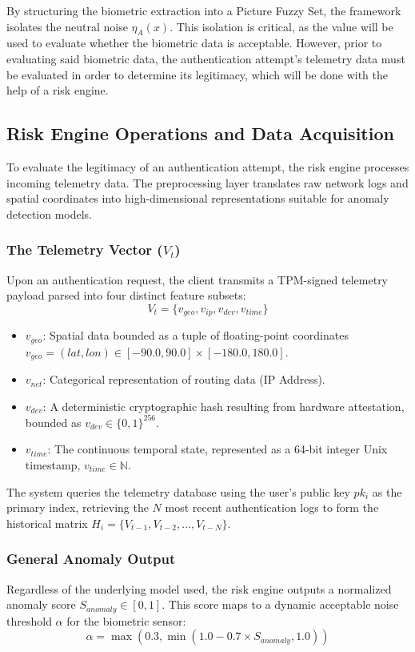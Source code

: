 \documentclass[pdflatex,sn-mathphys-num]{sn-jnl}
\theoremstyle{thmstyleone}%
\theoremstyle{thmstyletwo}%
\theoremstyle{thmstylethree}%
\begin{document}
By structuring the biometric extraction into a Picture Fuzzy Set, the framework  isolates the neutral noise $\eta_A(x)$. This isolation is critical, as the value will be used to evaluate whether the biometric data is acceptable. However, prior to evaluating said biometric data, the authentication attempt's telemetry data must be evaluated in order to determine its legitimacy, which will be done with the help of a risk engine.

\subsection{Risk Engine Operations and Data Acquisition}
To evaluate the legitimacy of an authentication attempt, the risk engine processes incoming telemetry data. The preprocessing layer translates raw network logs and spatial coordinates into high-dimensional representations suitable for anomaly detection models.

\subsubsection{The Telemetry Vector ($V_t$)}
Upon an authentication request, the client transmits a TPM-signed telemetry payload parsed into four distinct feature subsets:
\begin{equation}
	V_t = \{v_{geo}, v_{ip}, v_{dev}, v_{time}\} \tag{9}
\end{equation}

\begin{itemize}
    \item $v_{geo}$: Spatial data bounded as a tuple of floating-point coordinates $v_{geo} = (lat, lon) \in [-90.0, 90.0] \times [-180.0, 180.0]$.
    \item $v_{net}$: Categorical representation of routing data (IP Address).
    \item $v_{dev}$: A deterministic cryptographic hash resulting from hardware attestation, bounded as $v_{dev} \in \{0,1\}^{256}$.
    \item $v_{time}$: The continuous temporal state, represented as a 64-bit integer Unix timestamp, $v_{time} \in \mathbb{N}$.
\end{itemize}

The system queries the telemetry database using the user's public key $pk_i$ as the primary index, retrieving the $N$ most recent authentication logs to form the historical matrix $H_i = \{V_{t-1}, V_{t-2}, ..., V_{t-N}\}$. 

\subsubsection{General Anomaly Output}
Regardless of the underlying model used, the risk engine outputs a normalized anomaly score $S_{anomaly} \in [0, 1]$. This score maps to a dynamic acceptable noise threshold $\alpha$ for the biometric sensor:
\begin{equation}
\alpha = \max(0.3, \min(1.0 - 0.7 \times S_{anomaly}, 1.0)) \tag{10}
\end{equation}
\end{document}
